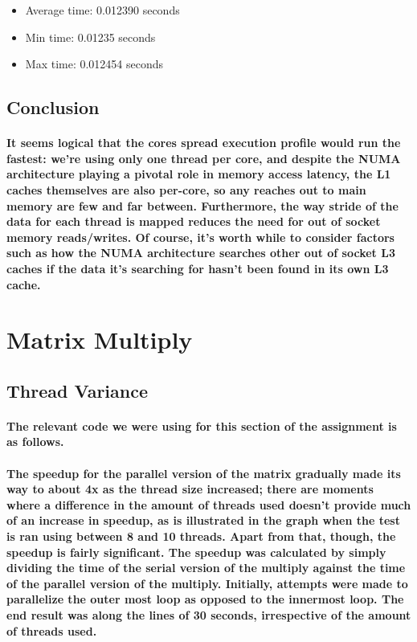 \documentclass[8pt, a4paper, twoside, twoclumn, english]{extreport}
\begin{document}
\begin{itemize}
  \item Average time: 0.012390 seconds
  \item Min time: 0.01235 seconds
  \item Max time: 0.012454 seconds    
\end{itemize}

\subsection{Conclusion}

\paragraph{It seems logical that the cores spread execution profile would run the fastest: we're using only one thread per core, and despite the NUMA architecture playing a pivotal role in memory access latency, the L1 caches themselves are also per-core, so any reaches out to main memory are few and far between. Furthermore, the way stride of the data for each thread is mapped reduces the need for out of socket memory reads/writes. Of course, it's worth while to consider factors such as how the NUMA architecture searches other out of socket L3 caches if the data it's searching for hasn't been found in its own L3 cache.}

\section{Matrix Multiply}

\subsection{Thread Variance}

\paragraph{The relevant code we were using for this section of the assignment is as follows.}

\paragraph{The speedup for the parallel version of the matrix gradually made its way to about 4x as the thread size increased; there are moments where a difference in the amount of threads used doesn't provide much of an increase in speedup, as is illustrated in the graph when the test is ran using between 8 and 10 threads. Apart from that, though, the speedup is fairly significant. The speedup was calculated by simply dividing the time of the serial version of the multiply against the time of the parallel version of the multiply.
Initially, attempts were made to parallelize the outer most loop as opposed to the innermost loop. The end result was along the lines of 30 seconds, irrespective of the amount of threads used.}
\end{document}
